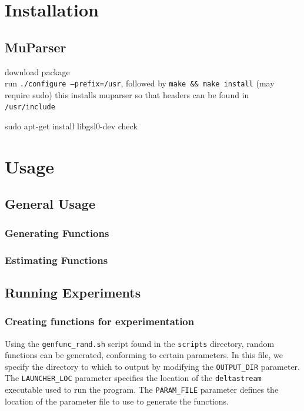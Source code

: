 \documentclass[a4paper,11pt]{article}
\begin{document}
\begin{appendices}
\section{Installation}
\label{sec-9}
\subsection{MuParser}
\label{sec-9-1}

 download package\\
 run \texttt{./configure --prefix=/usr}, followed by \texttt{make \&\& make install} (may require sudo)
 this installs muparser so that headers can be found in \texttt{/usr/include}
 \begin{verbatimtab}   
 sudo apt-get install libgsl0-dev check 
 \end{verbatimtab}
\section{Usage}
\label{sec-10}
\subsection{General Usage}
\label{sec-10-1}
\subsubsection{Generating Functions}
\label{sec-10-1-1}
\subsubsection{Estimating Functions}
\label{sec-10-1-2}
\subsection{Running Experiments}
\label{sec-10-2}
\subsubsection{Creating functions for experimentation}
\label{sec-10-2-1}

Using the \texttt{genfunc\_rand.sh} script found in the \texttt{scripts} directory, random
functions can be generated, conforming to certain parameters. In this file,
we specify the directory to which to output by modifying the
\texttt{OUTPUT\_DIR} parameter. The \texttt{LAUNCHER\_LOC} parameter specifies the
location of the \texttt{deltastream} executable used to run the program. The
\texttt{PARAM\_FILE} parameter defines the location of the parameter file to use
to generate the functions.


\end{appendices}
\end{document}
